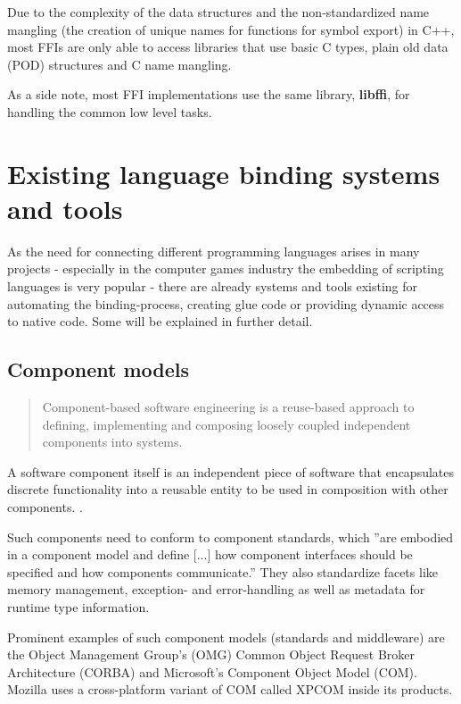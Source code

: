 
Due to the complexity of the data structures and the non-standardized name mangling (the creation of unique names for functions for symbol export) in C++, most FFIs are only able to access libraries that use basic C types, plain old data (POD) structures and C name mangling.

As a side note, most FFI implementations use the same library, \textbf{libffi}, for handling the common low level tasks.

\section{Existing language binding systems and tools}

As the need for connecting different programming languages arises in many projects - especially in the computer games industry the embedding of scripting languages is very popular - there are already systems and tools existing for automating the binding-process, creating glue code or providing dynamic access to native code. Some will be explained in further detail.

\subsection{Component models}

\begin{quotation}
Component-based software engineering is a reuse-based approach to defining, implementing and composing loosely coupled independent components into systems.
\end{quotation}

A software component itself is an independent piece of software that encapsulates discrete functionality into a reusable entity to be used in composition with other components. .

Such components need to conform to component standards, which ''are embodied in a component model and define [...] how component interfaces should be specified and how components communicate.'' They also standardize facets like memory management, exception- and error-handling as well as metadata for runtime type information.

Prominent examples of such component models (standards and middleware) are the Object Management Group's (OMG) Common Object Request Broker Architecture (CORBA) and Microsoft's Component Object Model (COM). Mozilla uses a cross-platform variant of COM called XPCOM inside its products.

